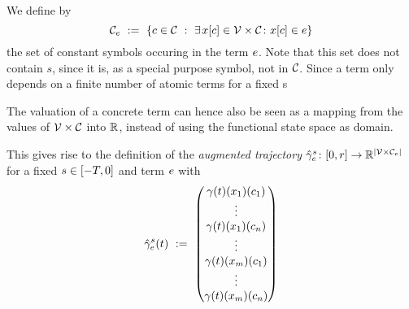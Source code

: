     \begin{definition}\label{def:termvars}
        We define by
        \begin{equation*}
            \constants[\astrm] \defeq \set{c\in\constants \with \mexists{\xtau[c]\in\delayvars}\holds\xtau[c]\in\astrm}
        \end{equation*}
        the set of constant symbols occuring in the term $\astrm$.
        Note that this set does not contain $s$, since it is, as a special purpose symbol, not in $\constants$.
        Since a term only depends on a finite number of atomic terms for a fixed s
        
        The valuation of a concrete term can hence also be seen as a mapping from the values of $\delayvars$
        into $\R$, instead of using the functional state space as domain.

        This gives rise to the definition of the \emph{augmented trajectory} $\augtrajectory[s]{\astrm}\from\compactum{0}{r}\to\R^{\abs{\delayvars[\astrm]}}$ for a fixed $s\in\delayinterval$ and term $\astrm$ with
        \begin{equation*}
            \augtrajectory[s]{\astrm}(t) \defeq \colvec{\trajectory(t)(x_1)(c_1)\\ \vdots\\ \trajectory(t)(x_1)(c_n)\\ \vdots\\ \trajectory(t)(x_m)(c_1)\\ \vdots\\ \trajectory(t)(x_m)(c_n)}
        \end{equation*}
    \end{definition}


